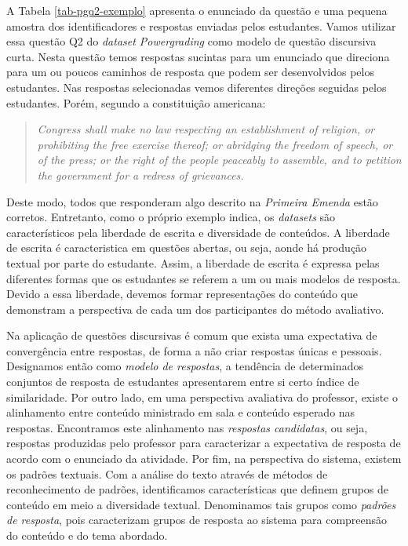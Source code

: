 A Tabela \ref{tab-pgq2-exemplo} apresenta o enunciado da questão e uma pequena amostra dos identificadores e respostas enviadas pelos estudantes. Vamos utilizar essa questão Q2 do \textit{dataset Powergrading} como modelo de questão discursiva curta. Nesta questão temos respostas sucintas para um enunciado que direciona para um ou poucos caminhos de resposta que podem ser desenvolvidos pelos estudantes. Nas respostas selecionadas vemos diferentes direções seguidas pelos estudantes. Porém, segundo a constituição americana:

\begin{quote}
\textit{Congress shall make no law respecting an establishment of religion, or prohibiting the free exercise thereof; or abridging the freedom of speech, or of the press; or the right of the people peaceably to assemble, and to petition the government for a redress of grievances.}
\end{quote}

Deste modo, todos que responderam algo descrito na \textit{Primeira Emenda} estão corretos. Entretanto, como o próprio exemplo indica, os \textit{datasets} são característicos pela liberdade de escrita e diversidade de conteúdos. A liberdade de escrita é caracteristica em questões abertas, ou seja, aonde há produção textual por parte do estudante. Assim, a liberdade de escrita é expressa pelas diferentes formas que os estudantes se referem a um ou mais modelos de resposta. Devido a essa liberdade, devemos formar representações do conteúdo que demonstram a perspectiva de cada um dos participantes do método avaliativo.

Na aplicação de questões discursivas é comum que exista uma expectativa de convergência entre respostas, de forma a não criar respostas únicas e pessoais. Designamos então como \textit{modelo de respostas}, a tendência de determinados conjuntos de resposta de estudantes apresentarem entre si certo índice de similaridade. Por outro lado, em uma perspectiva avaliativa do professor, existe o alinhamento entre conteúdo ministrado em sala e conteúdo esperado nas respostas. Encontramos este alinhamento nas \textit{respostas candidatas}, ou seja, respostas produzidas pelo professor para caracterizar a expectativa de resposta de acordo com o enunciado da atividade. Por fim, na perspectiva do sistema, existem os padrões textuais. Com a análise do texto através de métodos de reconhecimento de padrões, identificamos características que definem grupos de conteúdo em meio a diversidade textual. Denominamos tais grupos como \textit{padrões de resposta}, pois caracterizam grupos de resposta ao sistema para compreensão do conteúdo e do tema abordado. 

